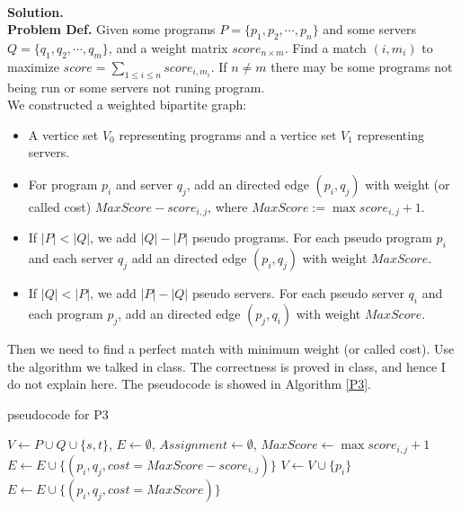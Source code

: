 \documentclass{article}
\begin{document}
\begin{enumerate}
~\\
\textbf{Solution.}~\\
\textbf{Problem Def.} Given some programs $P=\{p_1,p_2,\cdots,p_n\}$ and some servers $Q=\{q_1,q_2,\cdots,q_m\}$, and a weight matrix $score_{n\times m}$. Find a match $(i, m_i)$ to maximize $score = \sum_{1\leq i\leq n} score_{i,m_i}$. If $n\ne m$ there may be some programs not being run or some servers not runing program.\\
We constructed a weighted bipartite graph:
\begin{itemize}
    \item A vertice set $V_0$ representing programs and a vertice set $V_1$ representing servers.
    \item For program $p_i$ and server $q_j$, add an directed edge $(p_i,q_j)$ with weight (or called cost) $MaxScore - score_{i,j}$, where $MaxScore:=\max{score_{i,j}} + 1$.
    \item If $|P| < |Q|$, we add $|Q|-|P|$ pseudo programs. For each pseudo program $p_i$ and each server $q_j$ add an directed edge $(p_i, q_j)$ with weight $MaxScore$.
    \item If $|Q| < |P|$, we add $|P|-|Q|$ pseudo servers. For each pseudo server $q_i$ and each program $p_j$, add an directed edge $(p_j, q_i)$ with weight $MaxScore$. 
\end{itemize}
Then we need to find a perfect match with minimum weight (or called cost).
Use the algorithm we talked in class. The correctness is proved in class, and hence I do not explain here. The pseudocode is showed in Algorithm \ref{P3}.\\
\begin{minipage}[htb]{0.9\textwidth}
\begin{algorithm}[H]
\caption{pseudocode for P3}
\label{P3}
\begin{algorithmic}[1]
        \State $V\leftarrow P \cup Q \cup \{s, t\}$, $E\leftarrow \emptyset$, $Assignment \leftarrow \emptyset$, $MaxScore\leftarrow \max score_{i,j} + 1$
            \State $E \leftarrow E\cup \{(p_i, q_j, cost = MaxScore - score_{i,j})\}$
        \EndFor
                \State $V\leftarrow V\cup\{p_i\}$
                    \State $E\leftarrow E\cup\{(p_i, q_j, cost = MaxScore)\}$

\end{algorithmic}
\end{algorithm}
\end{minipage}
\end{enumerate}
\end{document}

